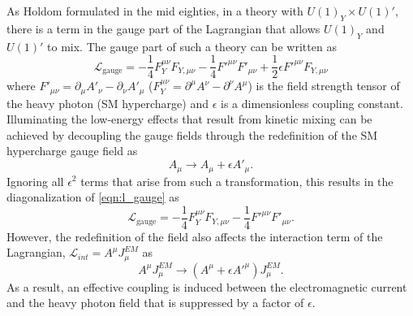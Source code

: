 As Holdom \cite{Holdom:1985ag} formulated in the mid eighties, in a theory with 
$U(1)_Y \times U(1)'$, there is a term in the gauge part of the Lagrangian 
that allows $U(1)_Y$ and $U(1)'$ to mix.  The gauge part of such a theory can
be written as
\begin{equation}
    \mathcal{L}_{\text{gauge}} = - \frac{1}{4} F_Y^{\mu \nu}F_{Y, \mu \nu}
                          - \frac{1}{4} F'^{\mu \nu}F'_{\mu \nu}
                          + \frac{1}{2} \epsilon F'^{\mu \nu} F_{Y, \mu \nu}
    \label{eqn:l_gauge}
\end{equation}
where $F'_{\mu \nu} = \partial_{\mu}A'_{\nu} - \partial_{\nu}A'_{\mu}$ 
($F^{\mu \nu}_{Y} = \partial^{\mu}A^{\nu} - \partial^{\nu}A^{\mu}$) is the
field strength tensor of the heavy photon (SM hypercharge) and $\epsilon$ is a
dimensionless coupling constant.  Illuminating the low-energy effects that result
from kinetic mixing can be achieved by decoupling the gauge fields through the
redefinition of the SM hypercharge gauge field as
\begin{equation}
    A_{\mu} \rightarrow A_{\mu} + \epsilon A'_{\mu}.
\end{equation}
Ignoring all $\epsilon^2$ terms that arise from such a transformation, this
results in the diagonalization of \ref{eqn:l_gauge} as
\begin{equation}
    \mathcal{L}_{\text{gauge}} = - \frac{1}{4} F_Y^{\mu \nu}F_{Y, \mu \nu}
                          - \frac{1}{4} F'^{\mu \nu}F'_{\mu \nu}.
\end{equation}
However, the redefinition of the field also affects the interaction term of 
the Lagrangian, $\mathcal{L}_{int} = A^{\mu}J_{\mu}^{EM}$ as
\begin{equation}
    A^{\mu}J_{\mu}^{EM} \rightarrow (A^{\mu} + \epsilon A'^{\mu})J_{\mu}^{EM}.
\end{equation}
As a result, an effective coupling is induced between the electromagnetic 
current and the heavy photon field that is suppressed by a factor of $\epsilon$.

